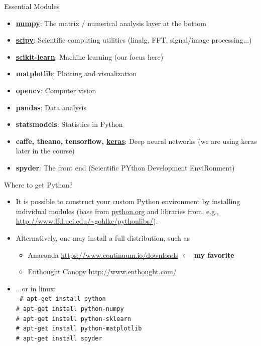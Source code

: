 \documentclass[10pt, aspectratio=169]{beamer} %
\begin{document}
\begin{frame}{Essential Modules}
\begin{itemize}
\item \textbf{\href{http://www.numpy.org/}{numpy}}: The matrix / numerical analysis layer at the bottom
\item \textbf{\href{https://www.scipy.org/}{scipy}}: Scientific computing utilities (linalg, FFT, signal/image processing...)
\item \textbf{\href{http://scikit-learn.org}{scikit-learn}}: Machine learning (our focus here)
\item \textbf{\href{http://matplotlib.org/}{matplotlib}}: Plotting and visualization
\item \textbf{opencv}: Computer vision
\item \textbf{pandas}: Data analysis
\item \textbf{statsmodels}: Statistics in Python
\item \textbf{caffe, theano, tensorflow, \href{http://keras.io/}{keras}}: Deep neural networks (we are using keras later in the course)
\item \textbf{spyder}: The front end (Scientific PYthon Development EnviRonment)
\end{itemize}
\end{frame}


\begin{frame}{Where to get Python?}
\begin{itemize}
\item It is possible to construct your custom Python environment by installing
individual modules (base from \url{python.org} and libraries from, e.g.,
\url{http://www.lfd.uci.edu/~gohlke/pythonlibs/}).
\item Alternatively, one may install a full distribution, such as
\begin{itemize}
\item Anaconda \url{https://www.continuum.io/downloads} \textbf{$\leftarrow$ my favorite}
\item Enthought Canopy \url{http://www.enthought.com/}
\end{itemize}
\item ...or in linux:\\
\noindent\texttt{
\noindent\hspace*{0.8cm}\# apt-get install python\\
\hspace*{1cm}\# apt-get install python-numpy\\
\hspace*{1cm}\# apt-get install python-sklearn\\ 
\hspace*{1cm}\# apt-get install python-matplotlib\\
\hspace*{1cm}\# apt-get install spyder
}
\end{itemize}
\end{frame}
\end{document}

